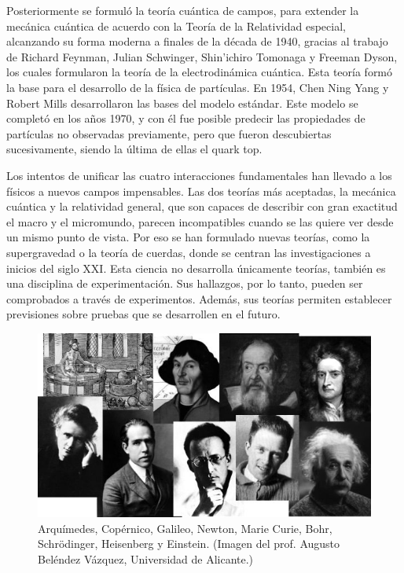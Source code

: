\begin{small}
Posteriormente se formuló la teoría cuántica de campos, para extender la mecánica cuántica de acuerdo con la Teoría de la Relatividad especial, alcanzando su forma moderna a finales de la década de 1940, gracias al trabajo de Richard Feynman, Julian Schwinger, Shin'ichiro Tomonaga y Freeman Dyson, los cuales formularon la teoría de la electrodinámica cuántica. Esta teoría formó la base para el desarrollo de la física de partículas. En 1954, Chen Ning Yang y Robert Mills desarrollaron las bases del modelo estándar. Este modelo se completó en los años 1970, y con él fue posible predecir las propiedades de partículas no observadas previamente, pero que fueron descubiertas sucesivamente, siendo la última de ellas el quark top.

Los intentos de unificar las cuatro interacciones fundamentales han llevado a los físicos a nuevos campos impensables. Las dos teorías más aceptadas, la mecánica cuántica y la relatividad general, que son capaces de describir con gran exactitud el macro y el micromundo, parecen incompatibles cuando se las quiere ver desde un mismo punto de vista. Por eso se han formulado nuevas teorías, como la supergravedad o la teoría de cuerdas, donde se centran las investigaciones a inicios del siglo XXI. Esta ciencia no desarrolla únicamente teorías, también es una disciplina de experimentación. Sus hallazgos, por lo tanto, pueden ser comprobados a través de experimentos. Además, sus teorías permiten establecer previsiones sobre pruebas que se desarrollen en el futuro.
\end{small}

\begin{figure}[H]
	\centering
	\includegraphics[width=1\textwidth]{imagenes/imagenes01/T01IM01.png}
	\caption{Arquímedes, Copérnico, Galileo, Newton, Marie Curie, Bohr, Schrödinger, Heisenberg y Einstein. \scriptsize{(Imagen del prof. Augusto Beléndez Vázquez, Universidad de Alicante.)}}
	\end{figure}

